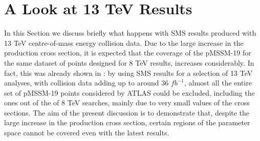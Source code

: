 \documentclass[a4paper,11pt]{article}
\begin{document}
\section{A Look at 13 TeV Results}\label{ch::13TeV}
In this Section we discuss briefly what happens with SMS results produced with 13 TeV centre-of-mass energy collision data. Due to the large increase in the production cross section, it is expected that the coverage of the pMSSM-19 for the same dataset of points designed for 8 TeV results, increases considerably. In fact, this was already shown in \cite{Dutta:2018ioj}: by using SMS results for a selection of 13 TeV analyses, with collision data adding up to around 36 $fb^{-1}$, almost all the entire set of pMSSM-19 points considered by ATLAS could be excluded, including the ones out of the of 8 TeV searches, mainly due to very small values of the cross sections. The aim of the present discussion is to demonstrate that, despite the large increase in the production cross section, certain regions of the parameter space cannot be covered even with the latest results. 
\\
\end{document}
